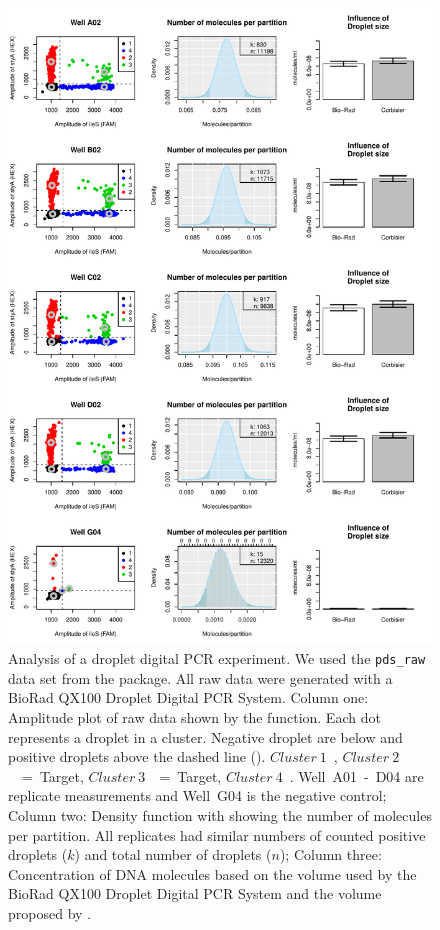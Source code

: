 \begin{figure}[htbp]
\centering
  \includegraphics[clip=true, width=12cm]{figures/dpcR_bioamp.pdf}
    \caption{Analysis of a droplet digital PCR experiment. We used the 
\texttt{pds\_raw} data set from the  package. All raw data were 
generated with a BioRad QX100 Droplet Digital PCR System. Column one: Amplitude 
plot of raw data shown by the  function. Each dot represents a 
droplet in a cluster. Negative droplet are below and positive droplets above the 
dashed line ({\textbf{\textendash\textendash}}). 
$Cluster~1$~\textcolor{black}{\textbf{\textbullet}}, 
$Cluster~2$~\textcolor{red}{\textbf{\textbullet}}~=~Target, 
$Cluster~3$~\textcolor{green}{\textbf{\textbullet}}~=~Target, 
$Cluster~4$~\textcolor{blue}{\textbf{\textbullet}}. Well~A01~-~D04 are replicate 
measurements and Well~G04 is the negative control; Column two: Density function 
with showing the number of molecules per partition. All replicates had similar 
numbers of counted positive droplets ($k$) and total number of droplets ($n$); 
Column three: Concentration of DNA molecules based on the volume used by the 
BioRad QX100 Droplet Digital PCR System and the volume proposed by 
\citet{corbisier_2015}. 
    }  \label{figure:dpcR_bioamp}
\end{figure}


